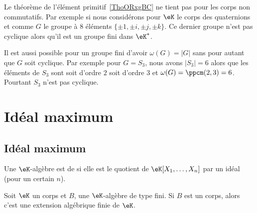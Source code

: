 \begin{example}
    Le théorème de l'élément primitif~\ref{ThoORxgBC} ne tient pas pour les corps non commutatifs. Par exemple si nous considérons pour \( \eK\) le corps des quaternions et comme \( G\) le groupe à \( 8\) éléments \( \{ \pm 1,\pm i,\pm j,\pm k \}\). Ce dernier groupe n'est pas cyclique alors qu'il est un groupe fini dans \( \eK^*\).
\end{example}

\begin{example}
    Il est aussi possible pour un groupe fini d'avoir \( \omega(G)=| G |\) sans pour autant que \( G\) soit cyclique. Par exemple pour \( G=S_3\), nous avons \( | S_3 |=6\) alors que les éléments de \( S_3\) sont soit d'ordre \( 2\) soit d'ordre \( 3\) et \( \omega(G)=\ppcm(2,3)=6\). Pourtant \( S_3\) n'est pas cyclique.
\end{example}

\section{Idéal maximum}

\subsection{Idéal maximum}

\begin{definition}  \label{DefWHDdTrC}
    Une \( \eK\)-algèbre est de  si elle est le quotient de \( \eK[X_1,\ldots, X_n]\) par un idéal (pour un certain \( n\)).
\end{definition}

\begin{theorem}      \label{ThonoZyKa}
    Soit \( \eK\) un corps et \( B\), une \( \eK\)-algèbre de type fini. Si \( B\) est un corps, alors c'est une extension algébrique finie de \( \eK\).
\end{theorem}

